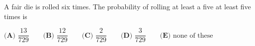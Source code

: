 A fair die is rolled six times. The probability of rolling at least a five at least five times is

$\textbf{(A) }\dfrac{13}{729}\qquad\textbf{(B) }\dfrac{12}{729}\qquad\textbf{(C) }\dfrac{2}{729}\qquad\textbf{(D) }\dfrac{3}{729}\qquad\textbf{(E) }\text{none of these}$
